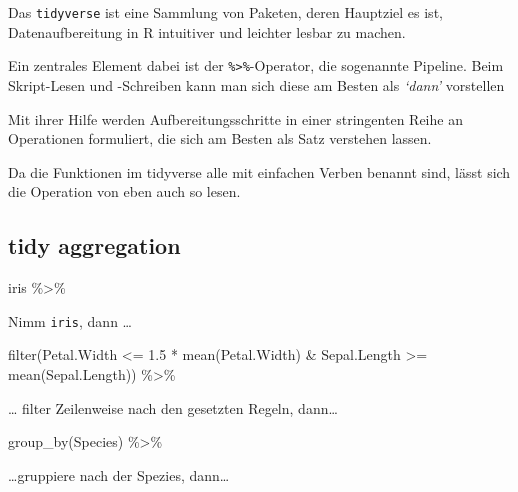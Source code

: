 \documentclass[
]{book}
\newenvironment{Shaded}{\begin{snugshade}}{\end{snugshade}}
\newcommand{\FloatTok}[1]{\textcolor[rgb]{0.00,0.00,0.81}{#1}}
\newcommand{\FunctionTok}[1]{\textcolor[rgb]{0.00,0.00,0.00}{#1}}
\newcommand{\NormalTok}[1]{#1}
\newcommand{\SpecialCharTok}[1]{\textcolor[rgb]{0.00,0.00,0.00}{#1}}
\begin{document}
Das \texttt{tidyverse} ist eine Sammlung von Paketen, deren Hauptziel es ist, Datenaufbereitung in R intuitiver und leichter lesbar zu machen.

Ein zentrales Element dabei ist der \texttt{\%\textgreater{}\%}-Operator, die sogenannte Pipeline. Beim Skript-Lesen und -Schreiben kann man sich diese am Besten als \emph{`dann'} vorstellen

Mit ihrer Hilfe werden Aufbereitungsschritte in einer stringenten Reihe an Operationen formuliert, die sich am Besten als Satz verstehen lassen.

Da die Funktionen im tidyverse alle mit einfachen Verben benannt sind, lässt sich die Operation von eben auch so lesen.

\hypertarget{tidy-aggregation-1}{%
\subsection{tidy aggregation}\label{tidy-aggregation-1}}

\begin{Shaded}
\begin{Highlighting}[]
\NormalTok{iris }\SpecialCharTok{\%\textgreater{}\%} 
\end{Highlighting}
\end{Shaded}

Nimm \texttt{iris}, dann \ldots{}

\begin{Shaded}
\begin{Highlighting}[]
  \FunctionTok{filter}\NormalTok{(Petal.Width }\SpecialCharTok{\textless{}=} \FloatTok{1.5} \SpecialCharTok{*} \FunctionTok{mean}\NormalTok{(Petal.Width) }\SpecialCharTok{\&}
\NormalTok{           Sepal.Length }\SpecialCharTok{\textgreater{}=} \FunctionTok{mean}\NormalTok{(Sepal.Length)) }\SpecialCharTok{\%\textgreater{}\%} 
\end{Highlighting}
\end{Shaded}

\ldots{} filter Zeilenweise nach den gesetzten Regeln, dann\ldots{}

\begin{Shaded}
\begin{Highlighting}[]
  \FunctionTok{group\_by}\NormalTok{(Species) }\SpecialCharTok{\%\textgreater{}\%} 
\end{Highlighting}
\end{Shaded}

\ldots gruppiere nach der Spezies, dann\ldots{}
\end{document}
